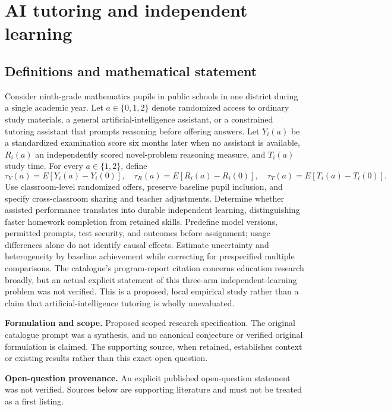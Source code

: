 \documentclass[11pt]{article}
\begin{document}
\section*{AI tutoring and independent learning}\label{30007735}
\subsection{Definitions and mathematical statement}
Consider ninth-grade mathematics pupils in public schools in one district during a single academic year. Let \(a\in\{0,1,2\}\) denote randomized access to ordinary study materials, a general artificial-intelligence assistant, or a constrained tutoring assistant that prompts reasoning before offering answers. Let \(Y_i(a)\) be a standardized examination score six months later when no assistant is available, \(R_i(a)\) an independently scored novel-problem reasoning measure, and \(T_i(a)\) study time. For every \(a\in\{1,2\}\), define
\[\tau_Y(a)=E[Y_i(a)-Y_i(0)],\quad\tau_R(a)=E[R_i(a)-R_i(0)],\quad\tau_T(a)=E[T_i(a)-T_i(0)].\]
Use classroom-level randomized offers, preserve baseline pupil inclusion, and specify cross-classroom sharing and teacher adjustments. Determine whether assisted performance translates into durable independent learning, distinguishing faster homework completion from retained skills. Predefine model versions, permitted prompts, test security, and outcomes before assignment; usage differences alone do not identify causal effects. Estimate uncertainty and heterogeneity by baseline achievement while correcting for prespecified multiple comparisons. The catalogue’s program-report citation concerns education research broadly, but an actual explicit statement of this three-arm independent-learning problem was not verified. This is a proposed, local empirical study rather than a claim that artificial-intelligence tutoring is wholly unevaluated.

\par\textbf{Formulation and scope.} Proposed scoped research specification. The original catalogue prompt was a synthesis, and no canonical conjecture or verified original formulation is claimed. The supporting source, when retained, establishes context or existing results rather than this exact open question.

\par\textbf{Open-question provenance.} An explicit published open-question statement was not verified. Sources below are supporting literature and must not be treated as a first listing.
\end{document}
